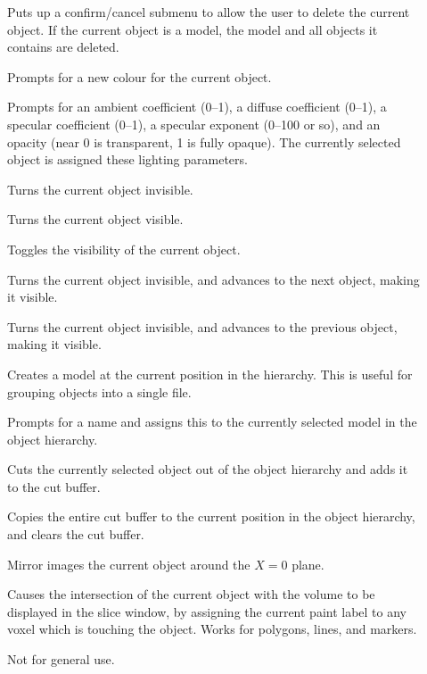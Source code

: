 \begin{description}
\item[]  Puts up a confirm/cancel submenu
        to allow the user to delete the current object.  If the current object
        is a model, the model and all objects it contains are deleted.
\item[]  Prompts for a new colour for the
        current object.
\item[]  Prompts for an ambient
        coefficient (0--1), a diffuse coefficient (0--1), a
        specular coefficient (0--1), a specular exponent (0--100 or so),
        and an opacity (near 0 is transparent, 1 is fully opaque).
        The currently selected object is assigned these lighting parameters.
\item[]  Turns the current object invisible.
\item[]  Turns the current object visible.
\item[]  Toggles the visibility of the
        current object.
\item[]  Turns the current object invisible,
               and advances to the next object, making it visible.
\item[]  Turns the current object invisible,
               and advances to the previous object, making it visible.
\item[]  Creates a model at the current
               position in the hierarchy.  This is useful for grouping
               objects into a single file.
\item[]  Prompts for a name and
               assigns this to the currently selected model in the object
               hierarchy.
\item[]  Cuts the currently selected object
               out of the object hierarchy and adds it to the cut buffer.
\item[]  Copies the entire cut buffer to
               the current position in the object hierarchy, and clears the
               cut buffer.
\item[]  Mirror images the current object
               around the $X = 0$ plane.
\item[]  Causes the intersection
     of the current object with the volume to be displayed in the
     slice window, by assigning the current paint label to any voxel
     which is touching the object.  Works for polygons, lines, and
     markers.
\item[]  Not for general use.
\end{description}

